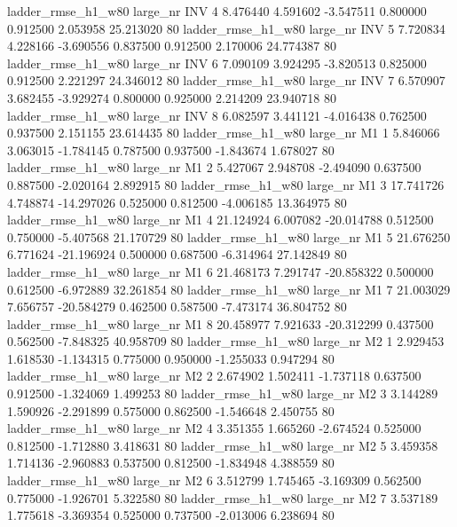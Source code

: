  ladder_rmse_h1_w80   large_nr      INV                 4  8.476440  4.591602  -3.547511 0.800000 0.912500  2.053958   25.213020 80
 ladder_rmse_h1_w80   large_nr      INV                 5  7.720834  4.228166  -3.690556 0.837500 0.912500  2.170006   24.774387 80
 ladder_rmse_h1_w80   large_nr      INV                 6  7.090109  3.924295  -3.820513 0.825000 0.912500  2.221297   24.346012 80
 ladder_rmse_h1_w80   large_nr      INV                 7  6.570907  3.682455  -3.929274 0.800000 0.925000  2.214209   23.940718 80
 ladder_rmse_h1_w80   large_nr      INV                 8  6.082597  3.441121  -4.016438 0.762500 0.937500  2.151155   23.614435 80
 ladder_rmse_h1_w80   large_nr       M1                 1  5.846066  3.063015  -1.784145 0.787500 0.937500 -1.843674    1.678027 80
 ladder_rmse_h1_w80   large_nr       M1                 2  5.427067  2.948708  -2.494090 0.637500 0.887500 -2.020164    2.892915 80
 ladder_rmse_h1_w80   large_nr       M1                 3 17.741726  4.748874 -14.297026 0.525000 0.812500 -4.006185   13.364975 80
 ladder_rmse_h1_w80   large_nr       M1                 4 21.124924  6.007082 -20.014788 0.512500 0.750000 -5.407568   21.170729 80
 ladder_rmse_h1_w80   large_nr       M1                 5 21.676250  6.771624 -21.196924 0.500000 0.687500 -6.314964   27.142849 80
 ladder_rmse_h1_w80   large_nr       M1                 6 21.468173  7.291747 -20.858322 0.500000 0.612500 -6.972889   32.261854 80
 ladder_rmse_h1_w80   large_nr       M1                 7 21.003029  7.656757 -20.584279 0.462500 0.587500 -7.473174   36.804752 80
 ladder_rmse_h1_w80   large_nr       M1                 8 20.458977  7.921633 -20.312299 0.437500 0.562500 -7.848325   40.958709 80
 ladder_rmse_h1_w80   large_nr       M2                 1  2.929453  1.618530  -1.134315 0.775000 0.950000 -1.255033    0.947294 80
 ladder_rmse_h1_w80   large_nr       M2                 2  2.674902  1.502411  -1.737118 0.637500 0.912500 -1.324069    1.499253 80
 ladder_rmse_h1_w80   large_nr       M2                 3  3.144289  1.590926  -2.291899 0.575000 0.862500 -1.546648    2.450755 80
 ladder_rmse_h1_w80   large_nr       M2                 4  3.351355  1.665260  -2.674524 0.525000 0.812500 -1.712880    3.418631 80
 ladder_rmse_h1_w80   large_nr       M2                 5  3.459358  1.714136  -2.960883 0.537500 0.812500 -1.834948    4.388559 80
 ladder_rmse_h1_w80   large_nr       M2                 6  3.512799  1.745465  -3.169309 0.562500 0.775000 -1.926701    5.322580 80
 ladder_rmse_h1_w80   large_nr       M2                 7  3.537189  1.775618  -3.369354 0.525000 0.737500 -2.013006    6.238694 80
